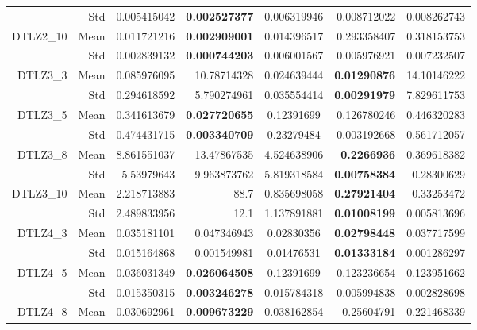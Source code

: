 \begin{table*}[htbp]
\begin{tabular}{rrrrrrr}
          & Std   & 0.005415042 & \textbf{0.002527377} & \multicolumn{1}{c}{0.006319946} & 0.008712022 & 0.008262743 \\
    \multirow{2}[0]{*}{DTLZ2\_10} & Mean  & 0.011721216 & \textbf{0.002909001} & \multicolumn{1}{c}{0.014396517} & 0.293358407 & 0.318153753 \\
          & Std   & 0.002839132 & \textbf{0.000744203} & \multicolumn{1}{c}{0.006001567} & 0.005976921 & 0.007232507 \\
    \multirow{2}[0]{*}{DTLZ3\_3} & Mean  & 0.085976095 & 10.78714328 & \multicolumn{1}{c}{0.024639444} & \textbf{0.01290876} & 14.10146222 \\
          & Std   & 0.294618592 & 5.790274961 & \multicolumn{1}{c}{0.035554414} & \textbf{0.00291979} & 7.829611753 \\
    \multirow{2}[0]{*}{DTLZ3\_5} & Mean  & 0.341613679 & \textbf{0.027720655} & \multicolumn{1}{c}{0.12391699} & 0.126780246 & 0.446320283 \\
          & Std   & 0.474431715 & \textbf{0.003340709} & \multicolumn{1}{c}{0.23279484} & 0.003192668 & 0.561712057 \\
    \multirow{2}[0]{*}{DTLZ3\_8} & Mean  & 8.861551037 & 13.47867535 & \multicolumn{1}{c}{4.524638906} & \textbf{0.2266936} & 0.369618382 \\
          & Std   & 5.53979643 & 9.963873762 & \multicolumn{1}{c}{5.819318584} & \textbf{0.00758384} & 0.28300629 \\
    \multirow{2}[0]{*}{DTLZ3\_10} & Mean  & 2.218713883 & 88.7  & \multicolumn{1}{c}{0.835698058} & \textbf{0.27921404} & 0.33253472 \\
          & Std   & 2.489833956 & 12.1  & \multicolumn{1}{c}{1.137891881} & \textbf{0.01008199} & 0.005813696 \\
    \multirow{2}[0]{*}{DTLZ4\_3} & Mean  & 0.035181101 & 0.047346943 & \multicolumn{1}{c}{0.02830356} & \textbf{0.02798448} & 0.037717599 \\
          & Std   & 0.015164868 & 0.001549981 & \multicolumn{1}{c}{0.01476531} & \textbf{0.01333184} & 0.001286297 \\
    \multirow{2}[0]{*}{DTLZ4\_5} & Mean  & 0.036031349 & \textbf{0.026064508} & \multicolumn{1}{c}{0.12391699} & 0.123236654 & 0.123951662 \\
          & Std   & 0.015350315 & \textbf{0.003246278} & \multicolumn{1}{c}{0.015784318} & 0.005994838 & 0.002828698 \\
    \multirow{2}[0]{*}{DTLZ4\_8} & Mean  & 0.030692961 & \textbf{0.009673229} & \multicolumn{1}{c}{0.038162854} & 0.25604791 & 0.221468339 \\

\end{tabular}
\end{table*}
